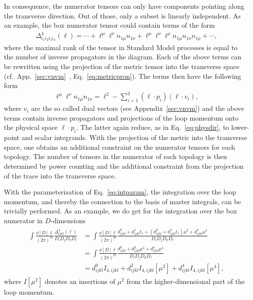 In consequence, the numerator tensors can only have components pointing along the
transverse direction. Out of those, only a subset is linearly
independent. As an example, the box numerator tensor could contain terms of
the form 
\begin{align}
   \Delta_{i_1i_2i_3i_4}^4(\ell) = \cdots + \ell^\mu\ell^\nu n_{1\mu}n_{1\nu}+\ell^\mu\ell^\nu\ell^\rho
n_{1\mu}n_{1\nu}n_{1\rho}+\cdots,
\end{align}
where the maximal rank of the tensor in Standard Model processes is equal to the
number of inverse propagators in the diagram. Each of the above terms can be rewritten
using the projection of the metric tensor into the transverse space
(cf.~App.~\ref{sec:vnvm}~, Eq.~\eqref{eq:metricpron}). The terms then
have the following form
\begin{align}
    \ell^\mu\ell^\nu n_{1\mu}n_{1\nu} = \ell^2 - \sum_{i=1}^3(\ell
    \cdot p_i)(\ell \cdot v_i),
\end{align}
where $v_i$ are the so called dual vectors (see
Appendix~\ref{sec:vnvm}) and the above terms contain inverse propagators and projections of the loop momentum onto the physical space $\ell
\cdot p_i$. The latter again reduce, as in
Eq.~\eqref{eq:physdir}, to lower-point and scalar
integrands. With the projection of the metric into the transverse
space, one obtains an additional constraint on the numerator tensors
for each topology. The number of tensors in the numerator of
each topology is then determined by power counting and the
additional constraint from the projection of the trace into the
transverse space.

With the parameterization of Eq.~\eqref{eq:intparam}, the integration
over the loop momentum, and thereby the connection to the basis of
master integrals, can be trivially performed. As an example, we do get for the
integration over the box numerator in $D$-dimensions
\begin{align}
\begin{split}
  \int\frac{\dd[D]{\ell}}{(2\pi)^{D}}\frac{\Delta^4_{ijkl}(\ell)}{D_iD_jD_kD_l}&= \int\frac{\dd[D]{\ell}}{(2\pi)^{D}}\frac{d^0_{ijkl}+d^1_{ijkl}t_1+(d^2_{ijkl}+d^3_{ijkl}t_1)\mu^2+d^4_{ijkl}\mu^4
}{D_iD_jD_kD_l}\\
&= \int\frac{\dd[D]{\ell}}{(2\pi)^{D}}\frac{d^0_{ijkl}+d^2_{ijkl}\mu^2+d^4_{ijkl}\mu^4
}{D_iD_jD_kD_l}\\
&= d^0_{ijkl}I_{4,ijkl}+d^2_{ijkl}I_{4,ijkl}[\mu^2]+d^4_{ijkl}I_{4,ijkl}[\mu^4],
\end{split}
\end{align}
where $I[\mu^2]$ denotes an insertions of $\mu^2$ from the higher-dimensional part of the loop
momentum. 


